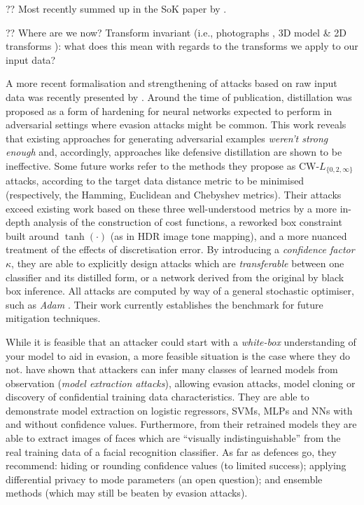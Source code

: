 ?? Most recently summed up in the SoK paper by \textcite{DBLP:conf/eurosp/PapernotMSW18}.

?? Where are we now? Transform invariant (i.e., photographs \cite{DBLP:journals/corr/KurakinGB16}, 3D model \& 2D transforms \cite{DBLP:journals/corr/AthalyeS17}): what does this mean with regards to the transforms we apply to our input data?

A more recent formalisation and strengthening of attacks based on raw input data was recently presented by \textcite{DBLP:conf/sp/Carlini017}.
Around the time of publication, distillation \cite{DBLP:conf/sp/PapernotM0JS16} was proposed as a form of hardening for neural networks expected to perform in adversarial settings where evasion attacks might be common.
This work reveals that existing approaches for generating adversarial examples \emph{weren't strong enough} and, accordingly, approaches like defensive distillation are shown to be ineffective.
Some future works refer to the methods they propose as CW-$L_{\{0, 2, \infty\}}$ attacks, according to the target data distance metric to be minimised (respectively, the Hamming, Euclidean and Chebyshev metrics).
Their attacks exceed existing work based on these three well-understood metrics by a more in-depth analysis of the construction of cost functions, a reworked box constraint built around $\tanh(\cdot)$ (as in HDR image tone mapping), and a more nuanced treatment of the effects of discretisation error.
By introducing a \emph{confidence factor} $\kappa$, they are able to explicitly design attacks which are \emph{transferable} between one classifier and its distilled form, or a network derived from the original by black box inference.
All attacks are computed by way of a general stochastic optimiser, such as \emph{Adam} \cite{DBLP:journals/corr/KingmaB14}.
Their work currently establishes the benchmark for future mitigation techniques.

While it is feasible that an attacker could start with a \emph{white-box} understanding of your model to aid in evasion, a more feasible situation is the case where they do not.
\textcite{DBLP:conf/uss/TramerZJRR16} have shown that attackers can infer many classes of learned models from observation (\emph{model extraction attacks}), allowing evasion attacks, model cloning or discovery of confidential training data characteristics.
They are able to demonstrate model extraction on logistic regressors, SVMs, MLPs and NNs with and without confidence values.
Furthermore, from their retrained models they are able to extract images of faces which are ``visually indistinguishable'' from the real training data of a facial recognition classifier.
As far as defences go, they recommend: hiding or rounding confidence values (to limited success); applying differential privacy to mode parameters (an open question); and ensemble methods (which may still be beaten by evasion attacks).

